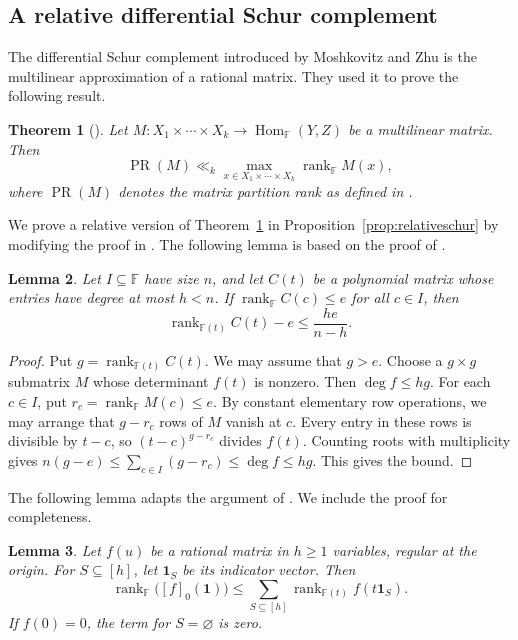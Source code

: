 \documentclass[11pt,reqno]{amsart}
\theoremstyle{plain}
\newtheorem{theorem}{Theorem}[section]
\newtheorem{lemma}[theorem]{Lemma}
\theoremstyle{definition}
\newcommand{\F}{\mathbb F}
\DeclareMathOperator{\Hom}{Hom}
\DeclareMathOperator{\prank}{PR}
\DeclareMathOperator{\rk}{rank}
\begin{document}
\subsection{A relative differential Schur complement}\label{sec:schur}
The differential Schur complement introduced by Moshkovitz and Zhu
\cite[Definition~4.3]{MZSchur} is the multilinear approximation of a rational matrix. They used it to prove the following result.
\begin{theorem}[{\cite[Theorem~1.1]{MZSchur}}]\label{thm:PRvsCR}
Let $M\colon X_1\times\cdots\times X_k\to\Hom_{\F}(Y,Z)$ be a multilinear matrix. Then
\[
 \prank(M)\ll_k\max_{x\in X_1\times\cdots\times X_k}\rk_{\F}M(x),
\]
where $\prank(M)$ denotes the matrix partition rank as defined in \cite{MZSchur}.
\end{theorem}
We prove a relative version of Theorem~\ref{thm:PRvsCR} in Proposition~\ref{prop:relativeschur} by modifying the proof in \cite{MZSchur}. The following lemma is based on the proof of \cite[Lemma~5.2]{MZSchur}.
\begin{lemma}\label{lem:line}
Let $I\subseteq\F$ have size $n$, and let $C(t)$ be a polynomial matrix whose entries have degree at most $h<n$. If $\rk_{\F} C(c)\leq e$ for all $c\in I$, then
\[
 \rk_{\F(t)} C(t)-e\leq\frac{he}{n-h}.
\]
\end{lemma}
\begin{proof}
Put $g=\rk_{\F(t)}C(t)$. We may assume that $g>e$. Choose a $g\times g$ submatrix $M$ whose determinant $f(t)$ is nonzero. Then $\deg f\leq hg$. For each $c\in I$, put $r_c=\rk_{\F}M(c)\leq e$. By constant elementary row operations, we may arrange that $g-r_c$ rows of $M$ vanish at $c$. Every entry in these rows is divisible by $t-c$, so $(t-c)^{g-r_c}$ divides $f(t)$.
Counting roots with multiplicity gives $n(g-e)\le\sum_{c\in I}(g-r_c)\leq\deg f\leq hg$.
This gives the bound.
\end{proof}
The following lemma adapts the argument of \cite[Proposition~3.7]{MZSchur}. We include the proof for completeness.
\begin{lemma}\label{lem:boolean}
Let $f(u)$ be a rational matrix in $h\ge1$ variables, regular at the origin. For $S\subseteq[h]$, let $\mathbf 1_S$ be its indicator vector. Then
\[
 \rk_{\F}\bigl([f]_0(\mathbf 1)\bigr)
 \leq\sum_{S\subseteq[h]}\rk_{\F(t)}f(t\mathbf 1_S).
\]
If $f(0)=0$, the term for $S=\varnothing$ is zero.
\end{lemma}
\end{document}
